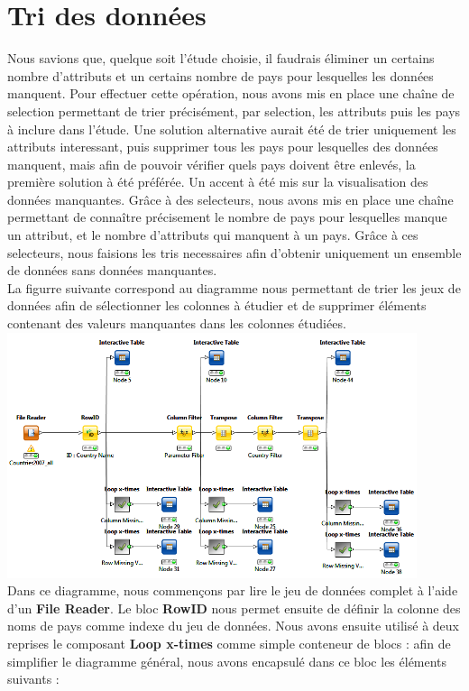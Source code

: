 \section{Tri des données}
    Nous savions que, quelque soit l'étude choisie, il faudrais éliminer un certains nombre d'attributs et un certains nombre de pays pour lesquelles les données manquent.
    Pour effectuer cette opération, nous avons mis en place une chaîne de selection permettant de trier précisément, par selection, les attributs puis les pays à inclure dans l'étude. Une solution alternative aurait été de trier uniquement les attributs interessant, puis supprimer tous les pays pour lesquelles des données manquent, mais afin de pouvoir vérifier quels pays doivent être enlevés, la première solution à été préférée.
    Un accent à été mis sur la visualisation des données manquantes. Grâce à des selecteurs, nous avons mis en place une chaîne permettant de connaître précisement le nombre de pays pour lesquelles manque un attribut, et le nombre d'attributs qui manquent à un pays.
    Grâce à ces selecteurs, nous faisions les tris necessaires afin d'obtenir uniquement un ensemble de données sans données manquantes.\\
	La figurre suivante correspond au diagramme nous permettant de trier les jeux de données afin de sélectionner les colonnes à étudier et de supprimer éléments contenant des valeurs manquantes dans les colonnes étudiées.\\	
	\includegraphics[width=0.9\textwidth]{Tri.png}	\\
	Dans ce diagramme, nous commençons par lire le jeu de données complet à l'aide d'un \textbf{File Reader}. Le bloc \textbf{RowID} nous permet ensuite de définir la colonne des noms de pays comme indexe du jeu de données. Nous avons ensuite utilisé à deux reprises le composant \textbf{Loop x-times} comme simple conteneur de blocs : afin de simplifier le diagramme général, nous avons encapsulé dans ce bloc les éléments suivants :\\
